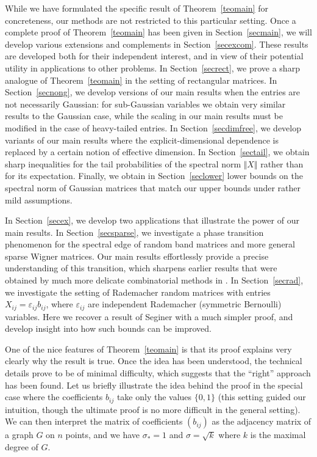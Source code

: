 \documentclass[aop,MSNbibl,dvips]{arximspdf}
\newcommand{\rrVert}{\Vert}
\newcommand{\llVert}{\Vert}
\begin{document}
While we have formulated the specific result of Theorem~\ref{teomain} for
concreteness, our methods are not restricted to this particular setting.
Once a complete proof of Theorem~\ref{teomain} has been given in
Section~\ref{secmain}, we will develop various extensions and
complements in
Section~\ref{secexcom}. These results are developed both for their
independent interest, and in view of their potential utility in
applications to other problems. In Section~\ref{secrect}, we prove a
sharp analogue of Theorem~\ref{teomain} in the setting of rectangular
matrices. In Section~\ref{secnong}, we develop versions of our main
results when the entries are not necessarily Gaussian: for sub-Gaussian
variables we obtain very similar results to the Gaussian case, while the
scaling in our main results must be modified in the case of heavy-tailed
entries. In Section~\ref{secdimfree}, we develop variants of our main
results where the explicit-dimensional dependence is replaced by a certain
notion of effective dimension. In Section~\ref{sectail}, we obtain sharp
inequalities for the tail probabilities of the spectral norm $\llVert
X\rrVert $
rather than for its expectation. Finally, we obtain in
Section~\ref{seclower} lower bounds on the spectral norm of Gaussian matrices
that match our upper bounds under rather mild assumptions.

In Section~\ref{secex}, we develop two applications that illustrate the
power of our main results. In Section~\ref{secsparse}, we investigate a
phase transition phenomenon for the spectral edge of random band matrices
and more general sparse Wigner matrices. Our main results effortlessly
provide a precise understanding of this transition, which sharpens earlier
results that were obtained by much more delicate combinatorial methods in
\cite{Kho08,Sod10,BGP14}. In Section~\ref{secrad}, we investigate the
setting of Rademacher random matrices with entries
$X_{ij}=\varepsilon_{ij}b_{ij}$, where $\varepsilon_{ij}$ are independent
Rademacher (symmetric Bernoulli) variables. Here we recover a result of
Seginer \cite{Seg00} with a much simpler proof, and develop insight into
how such bounds can be improved.

One of the nice features of Theorem~\ref{teomain} is that its proof
explains very clearly why the result is true. Once the idea has been
understood, the technical details prove to be of minimal difficulty, which
suggests that the ``right'' approach has been found. Let us briefly
illustrate the idea behind the proof in the special case where the
coefficients $b_{ij}$ take only the values $\{0,1\}$ (this setting guided
our intuition, though the ultimate proof is no more difficult in the
general setting). We can then interpret the matrix of
coefficients $(b_{ij})$ as the adjacency matrix of a graph $G$ on $n$
points, and we have $\sigma_*=1$ and $\sigma=\sqrt{k}$ where $k$ is the
maximal degree of $G$.
\end{document}
